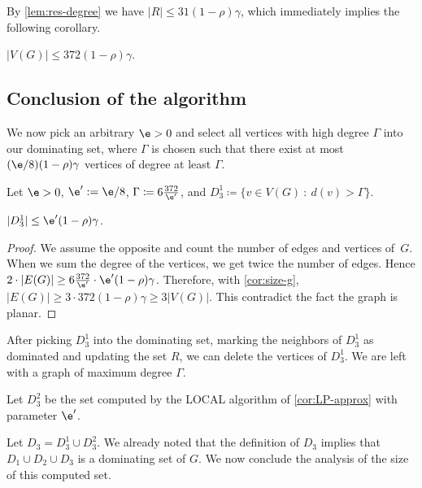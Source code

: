 By \cref{lem:res-degree} we have $|R|\le 31(1-\rho)\gamma$, which immediately
implies the following corollary.

\begin{cor}\label{cor:size-g}
  $|V(G)| \le 372(1-\rho)\gamma$.
\end{cor}


\subsection{Conclusion of the algorithm}


We now pick an arbitrary $\e>0$ and select all vertices with high degree
$\Gamma$ into our
dominating set, where $\Gamma$ is chosen such that there exist at
most $(\e/8)(1-\rho)\gamma$ vertices of degree at least $\Gamma$.

\begin{tcolorbox}[colback=red!5!white,colframe=red!50!black]
  Let $\e>0$, $\e':= \e/8$,
  $\Gamma\coloneqq 6\frac{372}{\e'}$, and \quad
  $D_3^1\coloneqq \{v\in V(G) ~:~ d(v)>\Gamma\}$.
\end{tcolorbox}

\begin{lemma}\label{lem:size-D31}
  $|D_3^1|\le \e'(1-\rho)\gamma$.
\end{lemma}
\begin{proof}
  We assume the opposite and count the number of edges and vertices of~$G$.
  When we sum the degree of the vertices, we get twice the number of
  edges. Hence $2\cdot |E(G)|\ge 6\frac{372}{\e'} \cdot \e'(1-\rho)\gamma$.
  Therefore, with \cref{cor:size-g},
  $|E(G)|\ge 3\cdot 372(1-\rho)\gamma\geq 3|V(G)|$. This
  contradict the fact the graph is planar.
\end{proof}

After picking $D_3^1$ into the dominating set, marking the neighbors of
$D_3^1$ as dominated and updating the set $R$, we can delete the
vertices of $D_3^1$. We are left with a graph of maximum degree $\Gamma$.

\begin{tcolorbox}[colback=red!5!white,colframe=red!50!black]
  Let $D_3^2$ be the set computed by the LOCAL algorithm of \cref{cor:LP-approx}
  with parameter $\e'$.
\end{tcolorbox}

Let $D_3=D_3^1 \cup D_3^2$. We already noted that the definition of $D_3$ implies that
$D_1\cup D_2\cup D_3$ is a dominating set of $G$. We now conclude the
analysis of the size of this computed set.

